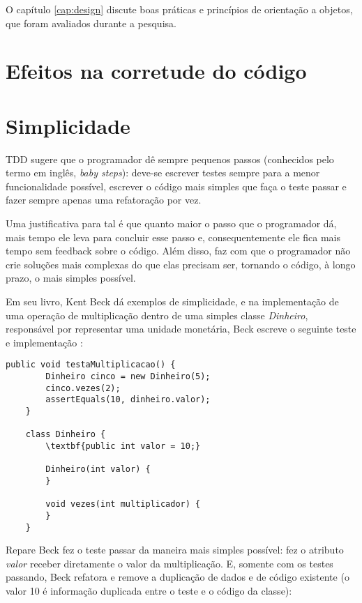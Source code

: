 O capítulo \ref{cap:design} discute boas práticas e princípios de orientação a
objetos, que foram avaliados durante a pesquisa.

\section{Efeitos na corretude do código}


\section{Simplicidade}

TDD sugere que o programador dê sempre pequenos passos (conhecidos pelo termo em
inglês, \textit{baby steps}): deve-se escrever testes sempre para a menor
funcionalidade possível, escrever o código mais simples que faça o teste passar
e fazer sempre apenas uma refatoração por vez.

Uma justificativa para tal é que quanto maior o passo que o programador dá, mais
tempo ele leva para concluir esse passo e, consequentemente ele fica mais tempo
sem feedback sobre o código. Além disso, faz com que o programador não crie
soluções mais complexas do que elas precisam ser, tornando o código, à longo
prazo, o mais simples possível.

Em seu livro, Kent Beck dá exemplos de simplicidade, e na implementação de uma
operação de multiplicação dentro de uma simples classe \textit{Dinheiro},
responsável por representar uma unidade monetária, Beck escreve o seguinte
teste e implementação \cite{TDDByExample}:

\begin{lstlisting}[frame=trbl]
    public void testaMultiplicacao() {
		Dinheiro cinco = new Dinheiro(5);
		cinco.vezes(2);
		assertEquals(10, dinheiro.valor);
	}
	
	class Dinheiro {
		\textbf{public int valor = 10;}
		
		Dinheiro(int valor) {
		}
		
		void vezes(int multiplicador) {
		}
	}

\end{lstlisting}

Repare Beck fez o teste passar da maneira mais simples possível: fez o atributo
\textit{valor} receber diretamente o valor da multiplicação. E, somente com os
testes passando, Beck refatora e remove a duplicação de dados e de código
existente (o valor 10 é informação duplicada entre o teste e o código da
classe):

